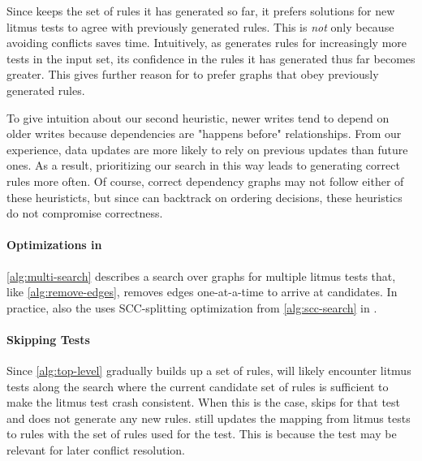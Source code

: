 Since \depsynth keeps the set of rules it has generated so far,
it prefers solutions for new litmus tests to agree with previously generated rules.
This is \textit{not} only because avoiding conflicts saves time.
Intuitively, as \depsynth generates rules for increasingly more tests in the input set,
its confidence in the rules it has generated thus far becomes greater.
This gives further reason for \depsynth to prefer graphs that obey previously generated rules.

To give intuition about our second heuristic, newer writes tend to depend on older writes
because dependencies are "happens before" relationships.
From our experience, data updates are more likely to rely on previous updates than future ones.
As a result, prioritizing our search in this way leads to generating correct rules more often.
Of course, correct dependency graphs may not follow either of these heuristicts,
but since \sccsearch can backtrack on ordering decisions,
these heuristics do not compromise correctness.

\paragraph{Optimizations in \multisearch}
\autoref{alg:multi-search} describes a search over graphs for multiple litmus
tests that, like \autoref{alg:remove-edges}, removes edges one-at-a-time
to arrive at candidates. In practice, \depsynth also the uses SCC-splitting
optimization from \autoref{alg:scc-search} in \multisearch.


\paragraph{Skipping Tests}
Since \autoref{alg:top-level} gradually builds up a set of rules,
\depsynth will likely encounter litmus tests along the search where
the current candidate set of rules is sufficient to make the litmus
test crash consistent. When this is the case, \depsynth skips 
for that test and does not generate any new rules. \depsynth still updates
the mapping from litmus tests to rules with the set of rules used for the test.
This is because the test may be relevant for later conflict resolution.

